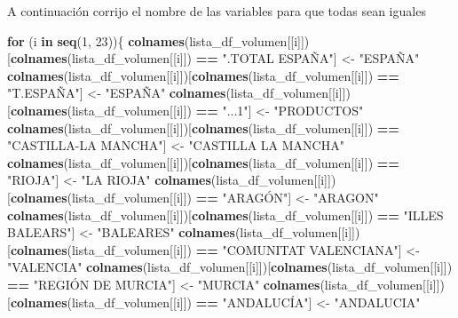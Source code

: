\documentclass[
]{article}
\newenvironment{Shaded}{\begin{snugshade}}{\end{snugshade}}
\newcommand{\ControlFlowTok}[1]{\textcolor[rgb]{0.13,0.29,0.53}{\textbf{#1}}}
\newcommand{\DecValTok}[1]{\textcolor[rgb]{0.00,0.00,0.81}{#1}}
\newcommand{\FunctionTok}[1]{\textcolor[rgb]{0.13,0.29,0.53}{\textbf{#1}}}
\newcommand{\NormalTok}[1]{#1}
\newcommand{\OtherTok}[1]{\textcolor[rgb]{0.56,0.35,0.01}{#1}}
\newcommand{\SpecialCharTok}[1]{\textcolor[rgb]{0.81,0.36,0.00}{\textbf{#1}}}
\newcommand{\StringTok}[1]{\textcolor[rgb]{0.31,0.60,0.02}{#1}}
\begin{document}
A continuación corrijo el nombre de las variables para que todas sean
iguales

\begin{Shaded}
\begin{Highlighting}[]
\ControlFlowTok{for}\NormalTok{ (i }\ControlFlowTok{in} \FunctionTok{seq}\NormalTok{(}\DecValTok{1}\NormalTok{, }\DecValTok{23}\NormalTok{))\{}
  \FunctionTok{colnames}\NormalTok{(lista\_df\_volumen[[i]])[}\FunctionTok{colnames}\NormalTok{(lista\_df\_volumen[[i]]) }\SpecialCharTok{==} \StringTok{".TOTAL ESPAÑA"}\NormalTok{] }\OtherTok{\textless{}{-}} \StringTok{"ESPAÑA"}  
  \FunctionTok{colnames}\NormalTok{(lista\_df\_volumen[[i]])[}\FunctionTok{colnames}\NormalTok{(lista\_df\_volumen[[i]]) }\SpecialCharTok{==} \StringTok{"T.ESPAÑA"}\NormalTok{] }\OtherTok{\textless{}{-}} \StringTok{"ESPAÑA"}
  \FunctionTok{colnames}\NormalTok{(lista\_df\_volumen[[i]])[}\FunctionTok{colnames}\NormalTok{(lista\_df\_volumen[[i]]) }\SpecialCharTok{==} \StringTok{"...1"}\NormalTok{] }\OtherTok{\textless{}{-}} \StringTok{"PRODUCTOS"}
  \FunctionTok{colnames}\NormalTok{(lista\_df\_volumen[[i]])[}\FunctionTok{colnames}\NormalTok{(lista\_df\_volumen[[i]]) }\SpecialCharTok{==} \StringTok{"CASTILLA{-}LA MANCHA"}\NormalTok{] }\OtherTok{\textless{}{-}} \StringTok{"CASTILLA LA MANCHA"}
  \FunctionTok{colnames}\NormalTok{(lista\_df\_volumen[[i]])[}\FunctionTok{colnames}\NormalTok{(lista\_df\_volumen[[i]]) }\SpecialCharTok{==} \StringTok{"RIOJA"}\NormalTok{] }\OtherTok{\textless{}{-}} \StringTok{"LA RIOJA"}
  \FunctionTok{colnames}\NormalTok{(lista\_df\_volumen[[i]])[}\FunctionTok{colnames}\NormalTok{(lista\_df\_volumen[[i]]) }\SpecialCharTok{==} \StringTok{"ARAGÓN"}\NormalTok{] }\OtherTok{\textless{}{-}} \StringTok{"ARAGON"}
  \FunctionTok{colnames}\NormalTok{(lista\_df\_volumen[[i]])[}\FunctionTok{colnames}\NormalTok{(lista\_df\_volumen[[i]]) }\SpecialCharTok{==} \StringTok{"ILLES BALEARS"}\NormalTok{] }\OtherTok{\textless{}{-}} \StringTok{"BALEARES"}
  \FunctionTok{colnames}\NormalTok{(lista\_df\_volumen[[i]])[}\FunctionTok{colnames}\NormalTok{(lista\_df\_volumen[[i]]) }\SpecialCharTok{==} \StringTok{"COMUNITAT VALENCIANA"}\NormalTok{] }\OtherTok{\textless{}{-}} \StringTok{"VALENCIA"}
  \FunctionTok{colnames}\NormalTok{(lista\_df\_volumen[[i]])[}\FunctionTok{colnames}\NormalTok{(lista\_df\_volumen[[i]]) }\SpecialCharTok{==} \StringTok{"REGIÓN DE MURCIA"}\NormalTok{] }\OtherTok{\textless{}{-}} \StringTok{"MURCIA"}
  \FunctionTok{colnames}\NormalTok{(lista\_df\_volumen[[i]])[}\FunctionTok{colnames}\NormalTok{(lista\_df\_volumen[[i]]) }\SpecialCharTok{==} \StringTok{"ANDALUCÍA"}\NormalTok{] }\OtherTok{\textless{}{-}} \StringTok{"ANDALUCIA"}

\end{Highlighting}
\end{Shaded}
\end{document}

